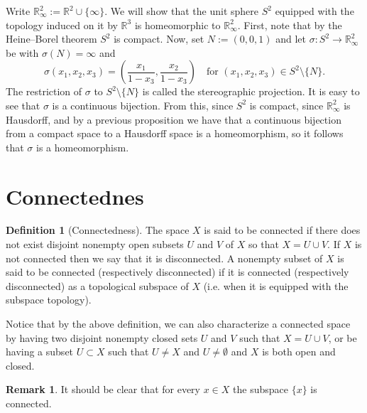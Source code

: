 \documentclass[11pt,a4paper]{article}
\theoremstyle{definition}
\newtheorem{definition}{Definition}[section]
\newtheorem{remark}{Remark}[section]
\theoremstyle{plain}
\newcommand{\R}{\mathbb{R}}
\begin{document}
  Write $\R^2_\infty := \R^2 \cup \{\infty\}$.
  We will show that the unit sphere $S^2$ equipped with the topology
  induced on it by $\R^3$ is homeomorphic to $\R^2_\infty$.
  First, note that by the Heine--Borel theorem $S^2$ is compact.
  Now, set $N := (0,0,1)$ and let $\sigma \colon S^2 \to \R^2_\infty$ be
  with $\sigma(N) = \infty$ and
  \[
    \sigma(x_1,x_2,x_3) =
    \left(\frac{x_1}{1 - x_3}, \frac{x_2}{1 - x_3}\right) \quad
    \text{for $(x_1,x_2,x_3) \in S^2 \setminus \{N\}$}.
  \]
  The restriction of $\sigma$ to $S^2 \setminus \{N\}$ is called the
  stereographic projection.
  It is easy to see that $\sigma$ is a continuous bijection.
  From this, since $S^2$ is compact,
  since $\R^2_\infty$ is Hausdorff,
  and by a previous proposition we have that a continuous bijection from
  a compact space to a Hausdorff space is a homeomorphism,
  so it follows that $\sigma$ is a homeomorphism.

  \newpage

  \section{Connectednes}
  \begin{definition}[Connectedness]
    The space $X$ is said to be connected if there does not exist disjoint
    nonempty open subsets $U$ and $V$ of $X$ so that $X = U \cup V$.
    If $X$ is not connected then we say that it is disconnected.
    A nonempty subset of $X$ is said to be connected 
    (respectively disconnected) if it is connected (respectively disconnected) 
    as a topological subspace of $X$
    (i.e. when it is equipped with the subspace topology).
  \end{definition}

  Notice that by the above definition, we can also characterize a connected
  space by having two disjoint nonempty closed sets $U$ and $V$ such that
  $X = U \cup V$, or be having a subset $U \subset X$ such that $U \neq X$
  and $U \neq \emptyset$ and $X$ is both open and closed.

  \begin{remark}
    It should be clear that for every $x \in X$ the subspace $\{x\}$ is
    connected.
  \end{remark}
\end{document}
